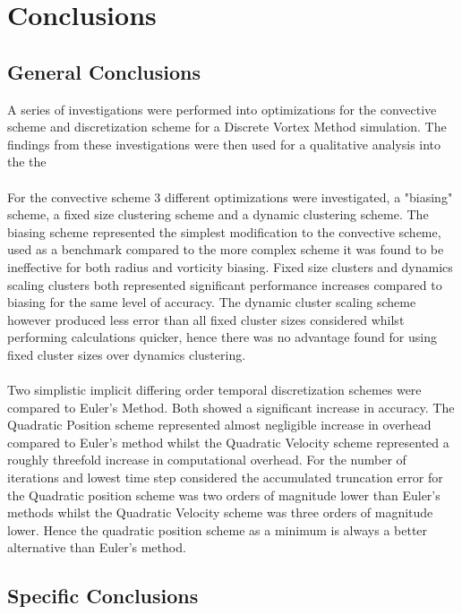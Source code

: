 \section{Conclusions}
\subsection{General Conclusions}
A series of investigations were performed into optimizations for the convective scheme and discretization scheme for a Discrete Vortex Method simulation. The findings from these investigations were then used for a qualitative analysis into the the
\\\\
For the convective scheme 3 different optimizations were investigated, a "biasing" scheme, a fixed size clustering scheme and a dynamic clustering scheme. The biasing scheme represented the simplest modification to the convective scheme, used as a benchmark compared to the more complex scheme it was found to be ineffective for both radius and vorticity biasing. Fixed size clusters and dynamics scaling clusters both represented significant performance increases compared to biasing for the same level of accuracy. The dynamic cluster scaling scheme however produced less error than all fixed cluster sizes considered whilst performing calculations quicker, hence there was no advantage found for using fixed cluster sizes over dynamics clustering. 
\\\\
Two simplistic implicit differing order temporal discretization schemes were compared to Euler's Method. Both showed a significant increase in accuracy. The Quadratic Position scheme represented almost negligible increase in overhead compared to Euler's method whilst the Quadratic Velocity scheme represented a roughly threefold increase in computational overhead. For the number of iterations and lowest time step considered the accumulated truncation error for the Quadratic position scheme was two orders of magnitude lower than Euler's methods whilst the Quadratic Velocity scheme was three orders of magnitude lower. Hence the quadratic position scheme as a minimum is always a better alternative than Euler's method. 

\subsection{Specific Conclusions}
